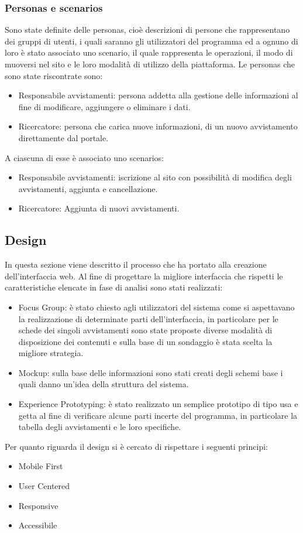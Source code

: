 \documentclass[a4paper,final,12pt]{report}
\begin{document}
\subsubsection{Personas e scenarios}
Sono state definite delle personas, cioè descrizioni di persone che rappresentano dei gruppi di utenti, i quali saranno gli utilizzatori del programma ed a ognuno di loro è stato associato uno scenario, il quale rappresenta le operazioni, il modo di muoversi nel sito e le loro modalità di utilizzo della piattaforma.
Le personas che sono state riscontrate sono:
\begin{itemize}
 \item Responsabile avvistamenti: persona addetta alla gestione delle informazioni al fine di modificare, aggiungere o eliminare i dati. 
\item Ricercatore: persona che carica nuove informazioni, di un nuovo avvistamento direttamente dal portale.
 \end{itemize} 
 A ciascuna di esse è associato uno scenarios:
 \begin{itemize}
 \item Responsabile avvistamenti: iscrizione al sito con possibilità di modifica degli avvistamenti, aggiunta e cancellazione.
 \item Ricercatore: Aggiunta di nuovi avvistamenti.
 \end{itemize}

\subsection{Design}
In questa sezione viene descritto il processo che ha portato alla creazione dell'interfaccia web.
Al fine di progettare la migliore interfaccia che rispetti le caratteristiche elencate in fase di analisi sono stati realizzati:
\begin{itemize}
\item Focus Group: è stato chiesto agli utilizzatori del sistema come si aspettavano la realizzazione di determinate parti dell'interfaccia, in particolare per le schede dei singoli avvistamenti sono state proposte diverse modalità di disposizione dei contenuti e sulla base di un sondaggio è stata scelta la migliore strategia.
\item Mockup: sulla base delle informazioni sono stati creati degli schemi base i quali danno un'idea della struttura del sistema.
\item Experience Prototyping: è stato realizzato un semplice prototipo di tipo usa e getta al fine di verificare alcune parti incerte del programma, in particolare la tabella degli avvistamenti e le loro specifiche.
\end{itemize}
Per quanto riguarda il design si è cercato di rispettare i seguenti principi:
\begin{itemize}
\item Mobile First
\item User Centered
\item Responsive
\item Accessibile
\end{itemize}
\end{document}
